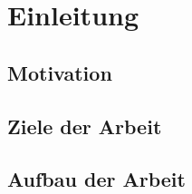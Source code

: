 \chapter{Einleitung}\label{sec:Einleitung}


\section{Motivation}\label{Motivation}
\section{Ziele der Arbeit}\label{Ziele}
\section{Aufbau der Arbeit}\label{Aufbau}
